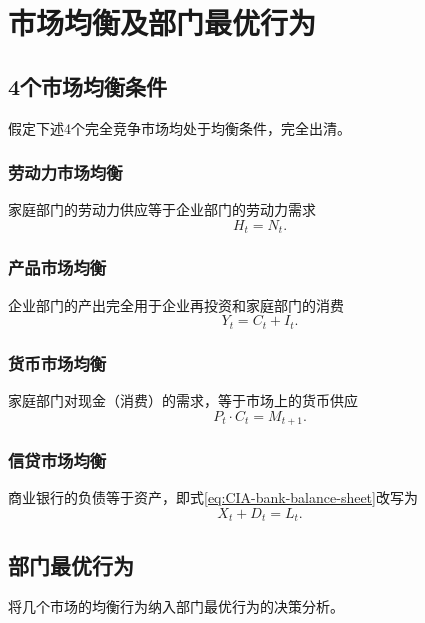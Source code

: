\section{市场均衡及部门最优行为}

\subsection{4个市场均衡条件}
假定下述4个完全竞争市场均处于均衡条件，完全出清。

\subsubsection{劳动力市场均衡}

家庭部门的劳动力供应等于企业部门的劳动力需求
\begin{equation}
  \label{eq:CIA-market-clearing-labor}
  H_t = N_t.
\end{equation}

\subsubsection{产品市场均衡}

企业部门的产出完全用于企业再投资和家庭部门的消费
\begin{equation}
  \label{eq:CIA-market-clearing-product}
  Y_t = C_t + I_t.
\end{equation}

\subsubsection{货币市场均衡}

家庭部门对现金（消费）的需求，等于市场上的货币供应
\begin{equation}
  \label{eq:CIA-market-clearing-money}
  P_t \cdot C_t = M_{t+1}.
\end{equation}

\subsubsection{信贷市场均衡}

商业银行的负债等于资产，即式\eqref{eq:CIA-bank-balance-sheet}改写为
\begin{equation}
  \label{eq:CIA-market-clearning-credit}
  X_t + D_t = L_t.
\end{equation}



\subsection{部门最优行为}
将几个市场的均衡行为纳入部门最优行为的决策分析。

